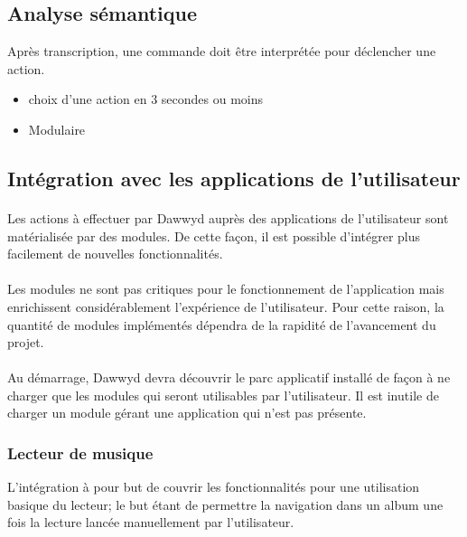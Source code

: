 \documentclass[12pt]{article}
\begin{document}
    \subsection{Analyse sémantique}
    Après transcription, une commande doit être interprétée pour déclencher une
    action.
    \begin{itemize}
        \item choix d'une action en 3 secondes ou moins
        \item Modulaire
    \end{itemize}

    \subsection{Intégration avec les applications de l'utilisateur}
    \paragraph{}
    Les actions à effectuer par Dawwyd auprès des applications de l'utilisateur
    sont matérialisée par des modules. De cette façon, il est possible
    d'intégrer plus facilement de nouvelles fonctionnalités.

    \paragraph{}
    Les modules ne sont pas critiques pour le fonctionnement de l'application
    mais enrichissent considérablement l'expérience de l'utilisateur. Pour
    cette raison, la quantité de modules implémentés dépendra de la rapidité
    de l'avancement du projet.

    \paragraph{}
    Au démarrage, Dawwyd devra découvrir le parc applicatif installé de façon à
    ne charger que les modules qui seront utilisables par l'utilisateur. Il est
    inutile de charger un module gérant une application qui n'est pas présente.


    \subsubsection{Lecteur de musique}
    L'intégration à pour but de couvrir les fonctionnalités pour une utilisation
    basique du lecteur; le but étant de permettre la navigation dans un album
    une fois la lecture lancée manuellement par l'utilisateur.
\end{document}
